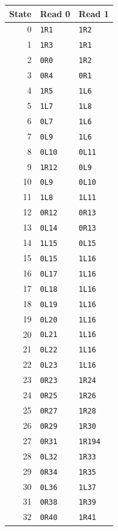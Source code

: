 \begin{longtable}{rll}
\toprule State & Read 0 & Read 1\\\midrule\endhead
0 & \texttt{1R1} & \texttt{1R2}\\
1 & \texttt{1R3} & \texttt{1R1}\\
2 & \texttt{0R0} & \texttt{1R2}\\
3 & \texttt{0R4} & \texttt{0R1}\\
4 & \texttt{1R5} & \texttt{1L6}\\
5 & \texttt{1L7} & \texttt{1L8}\\
6 & \texttt{0L7} & \texttt{1L6}\\
7 & \texttt{0L9} & \texttt{1L6}\\
8 & \texttt{0L10} & \texttt{0L11}\\
9 & \texttt{1R12} & \texttt{0L9}\\
10 & \texttt{0L9} & \texttt{0L10}\\
11 & \texttt{1L8} & \texttt{1L11}\\
12 & \texttt{0R12} & \texttt{0R13}\\
13 & \texttt{0L14} & \texttt{0R13}\\
14 & \texttt{1L15} & \texttt{0L15}\\
15 & \texttt{0L15} & \texttt{1L16}\\
16 & \texttt{0L17} & \texttt{1L16}\\
17 & \texttt{0L18} & \texttt{1L16}\\
18 & \texttt{0L19} & \texttt{1L16}\\
19 & \texttt{0L20} & \texttt{1L16}\\
20 & \texttt{0L21} & \texttt{1L16}\\
21 & \texttt{0L22} & \texttt{1L16}\\
22 & \texttt{0L23} & \texttt{1L16}\\
23 & \texttt{0R23} & \texttt{1R24}\\
24 & \texttt{0R25} & \texttt{1R26}\\
25 & \texttt{0R27} & \texttt{1R28}\\
26 & \texttt{0R29} & \texttt{1R30}\\
27 & \texttt{0R31} & \texttt{1R194}\\
28 & \texttt{0L32} & \texttt{1R33}\\
29 & \texttt{0R34} & \texttt{1R35}\\
30 & \texttt{0L36} & \texttt{1L37}\\
31 & \texttt{0R38} & \texttt{1R39}\\
32 & \texttt{0R40} & \texttt{1R41}\\

\end{longtable}
